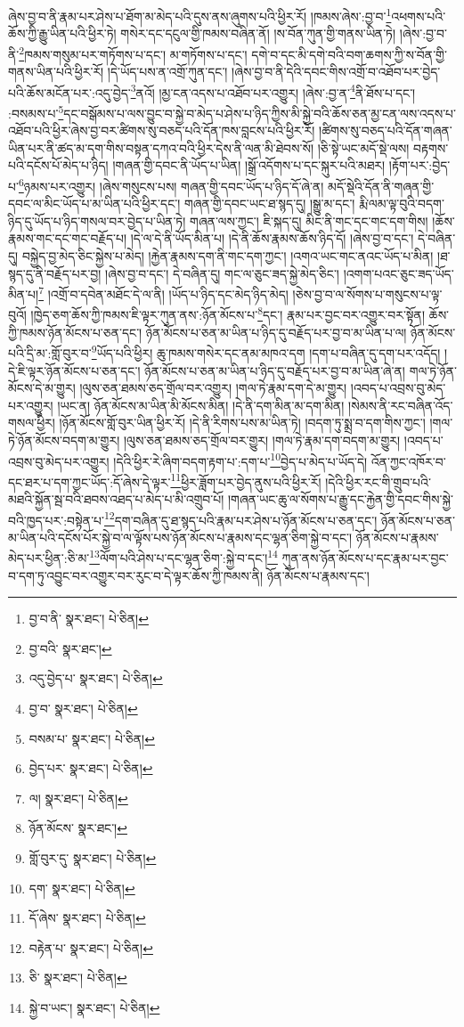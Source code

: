 ཞེས་བྱ་བ་ནི་རྣམ་པར་ཤེས་པ་ཐོག་མ་མེད་པའི་དུས་ནས་ཞུགས་པའི་ཕྱིར་རོ། །ཁམས་ཞེས་:བྱ་བ་\footnote{བྱ་བ་ནི་  སྣར་ཐང་།  པེ་ཅིན། }འཕགས་པའི་ཆོས་ཀྱི་རྒྱུ་ཡིན་པའི་ཕྱིར་ཏེ། གསེར་དང་དངུལ་གྱི་ཁམས་བཞིན་ནོ། །ས་བོན་ཀུན་གྱི་གནས་ཡིན་ཏེ། །ཞེས་:བྱ་བ་ནི་\footnote{བྱ་བའི་  སྣར་ཐང་། }ཁམས་གསུམ་པར་གཏོགས་པ་དང་། མ་གཏོགས་པ་དང་། དགེ་བ་དང་མི་དགེ་བའི་བག་ཆགས་ཀྱི་ས་བོན་གྱི་གནས་ཡིན་པའི་ཕྱིར་རོ། །དེ་ཡོད་པས་ན་འགྲོ་ཀུན་དང་། །ཞེས་བྱ་བ་ནི་དེའི་དབང་གིས་འགྲོ་བ་འཐོབ་པར་བྱེད་པའི་ཆོས་མངོན་པར་:འདུ་བྱེད་\footnote{འདུ་བྱེད་པ་  སྣར་ཐང་།  པེ་ཅིན། }ནའོ། །མྱ་ངན་འདས་པ་འཐོབ་པར་འགྱུར། །ཞེས་:བྱ་ན་\footnote{བྱ་བ་  སྣར་ཐང་།  པེ་ཅིན། }ནི་ཐོས་པ་དང་། :བསམས་པ་\footnote{བསམ་པ་  སྣར་ཐང་།  པེ་ཅིན། }དང་བསྒོམས་པ་ལས་བྱུང་བ་སྐྱེ་བ་མེད་པ་ཤེས་པ་ཉིད་ཀྱིས་མི་སྐྱེ་བའི་ཆོས་ཅན་མྱ་ངན་ལས་འདས་པ་འཐོབ་པའི་ཕྱིར་ཞེས་བྱ་བར་ཚིགས་སུ་བཅད་པའི་དོན་ཁས་བླངས་པའི་ཕྱིར་རོ། །ཚིགས་སུ་བཅད་པའི་དོན་གཞན་ཡིན་པར་ནི་ཚད་མ་དག་གིས་བསྟན་དཀའ་བའི་ཕྱིར་དེས་ནི་ལན་མི་ཐེབས་སོ། །ཅི་སྟེ་ཡང་མདོ་སྡེ་ལས། བརྟགས་པའི་དངོས་པོ་མེད་པ་ཉིད། །གཞན་གྱི་དབང་ནི་ཡོད་པ་ཡིན། །སྒྲོ་འདོགས་པ་དང་སྐུར་པའི་མཐར། །རྟོག་པར་:བྱེད་པ་\footnote{བྱེད་པར་  སྣར་ཐང་།  པེ་ཅིན། }ཉམས་པར་འགྱུར། །ཞེས་གསུངས་པས། གཞན་གྱི་དབང་ཡོད་པ་ཉིད་དོ་ཞེ་ན། མདོ་སྡེའི་དོན་ནི་གཞན་གྱི་དབང་ལ་མིང་ཡོད་པ་མ་ཡིན་པའི་ཕྱིར་དང་། གཞན་གྱི་དབང་ཡང་ཐ་སྙད་དུ། །སྒྱུ་མ་དང་། རྨི་ལམ་ལྟ་བུའི་བདག་ཉིད་དུ་ཡོད་པ་ཉིད་གསལ་བར་བྱེད་པ་ཡིན་ཏེ། གཞན་ལས་ཀྱང་། ཇི་སྐད་དུ། མིང་ནི་གང་དང་གང་དག་གིས། །ཆོས་རྣམས་གང་དང་གང་བརྗོད་པ། །དེ་ལ་དེ་ནི་ཡོད་མིན་པ། །དེ་ནི་ཆོས་རྣམས་ཆོས་ཉིད་དོ། །ཞེས་བྱ་བ་དང་། དེ་བཞིན་དུ། བསྐྱེད་བྱ་མེད་ཅིང་སྐྱེས་པ་མེད། །རྐྱེན་རྣམས་དག་ནི་གང་དག་ཀྱང་། །འགའ་ཡང་གང་ནའང་ཡོད་པ་མིན། །ཐ་སྙད་དུ་ནི་བརྗོད་པར་བྱ། །ཞེས་བྱ་བ་དང་། དེ་བཞིན་དུ། གང་ལ་ཅུང་ཟད་སྐྱེ་མེད་ཅིང་། །འགག་པའང་ཅུང་ཟད་ཡོད་མིན་པ།\footnote{ལ།  སྣར་ཐང་།  པེ་ཅིན། } །འགྲོ་བ་དབེན་མཐོང་དེ་ལ་ནི། །ཡོད་པ་ཉིད་དང་མེད་ཉིད་མེད། །ཅེས་བྱ་བ་ལ་སོགས་པ་གསུངས་པ་ལྟ་བུའོ། །ཁྱེད་ཅག་ཆོས་ཀྱི་ཁམས་ཇི་ལྟར་ཀུན་ནས་:ཉོན་མོངས་པ་\footnote{ཉོན་མོངས་  སྣར་ཐང་། }དང་། རྣམ་པར་བྱང་བར་འགྱུར་བར་སྟོན། ཆོས་ཀྱི་ཁམས་ཉོན་མོངས་པ་ཅན་དང་། ཉོན་མོངས་པ་ཅན་མ་ཡིན་པ་ཉིད་དུ་བརྗོད་པར་བྱ་བ་མ་ཡིན་པ་ལ། ཉོན་མོངས་པའི་དྲི་མ་:གློ་བུར་བ་\footnote{གློ་བུར་དུ་  སྣར་ཐང་།  པེ་ཅིན། }ཡོད་པའི་ཕྱིར། ཆུ་ཁམས་གསེར་དང་ནམ་མཁའ་དག །དག་པ་བཞིན་དུ་དག་པར་འདོད། །དེ་ཇི་ལྟར་ཉོན་མོངས་པ་ཅན་དང་། ཉོན་མོངས་པ་ཅན་མ་ཡིན་པ་ཉིད་དུ་བརྗོད་པར་བྱ་བ་མ་ཡིན་ཞེ་ན། གལ་ཏེ་ཉོན་མོངས་དེ་མ་གྱུར། །ལུས་ཅན་ཐམས་ཅད་གྲོལ་བར་འགྱུར། །གལ་ཏེ་རྣམ་དག་དེ་མ་གྱུར། །འབད་པ་འབྲས་བུ་མེད་པར་འགྱུར། །ཡང་ན། ཉོན་མོངས་མ་ཡིན་མི་མོངས་མིན། །དེ་ནི་དག་མིན་མ་དག་མིན། །སེམས་ནི་རང་བཞིན་འོད་གསལ་ཕྱིར། །ཉོན་མོངས་གློ་བུར་ཡིན་ཕྱིར་རོ། །དེ་ནི་རིགས་པས་མ་ཡིན་ཏེ། །བདག་ཏུ་སྨྲ་བ་དག་གིས་ཀྱང་། །གལ་ཏེ་ཉོན་མོངས་བདག་མ་གྱུར། །ལུས་ཅན་ཐམས་ཅད་གྲོལ་བར་གྱུར། །གལ་ཏེ་རྣམ་དག་བདག་མ་གྱུར། །འབད་པ་འབྲས་བུ་མེད་པར་འགྱུར། །དེའི་ཕྱིར་རེ་ཞིག་བདག་རྟག་པ་:དག་པ་\footnote{དག་  སྣར་ཐང་།  པེ་ཅིན། }བྱེད་པ་མེད་པ་ཡོད་དེ། འོན་ཀྱང་འཁོར་བ་དང་ཐར་པ་དག་ཀྱང་ཡོད་:དོ་ཞེས་དེ་ལྟར་\footnote{དོ་ཞེས་  སྣར་ཐང་།  པེ་ཅིན། }ཕྱིར་ཟློག་པར་བྱེད་ནུས་པའི་ཕྱིར་རོ། །དེའི་ཕྱིར་རང་གི་གྲུབ་པའི་མཐའི་སྐྱོན་སྦ་བའི་ཐབས་འཐད་པ་མེད་པ་མི་འགྲུབ་པོ། །གཞན་ཡང་ཆུ་ལ་སོགས་པ་རྒྱུ་དང་རྐྱེན་གྱི་དབང་གིས་སྐྱེ་བའི་ཁྱད་པར་:བསྟེན་པ་\footnote{བརྟེན་པ་  སྣར་ཐང་།  པེ་ཅིན། }དག་བཞིན་དུ་ཐ་སྙད་པའི་རྣམ་པར་ཤེས་པ་ཉོན་མོངས་པ་ཅན་དང་། ཉོན་མོངས་པ་ཅན་མ་ཡིན་པའི་དངོས་པོར་སྐྱེ་བ་ལ་ལྟོས་པས་ཉོན་མོངས་པ་རྣམས་དང་ལྷན་ཅིག་སྐྱེ་བ་དང་། ཉོན་མོངས་པ་རྣམས་མེད་པར་ཕྱིན་:ཅི་མ་\footnote{ཅི་  སྣར་ཐང་།  པེ་ཅིན། }ལོག་པའི་ཤེས་པ་དང་ལྷན་ཅིག་:སྐྱེ་བ་དང་།\footnote{སྐྱེ་བ་ཡང་།  སྣར་ཐང་།  པེ་ཅིན། } ཀུན་ནས་ཉོན་མོངས་པ་དང་རྣམ་པར་བྱང་བ་དག་ཏུ་འབྱུང་བར་འགྱུར་བར་རུང་བ་དེ་ལྟར་ཆོས་ཀྱི་ཁམས་ནི། ཉོན་མོངས་པ་རྣམས་དང་། 